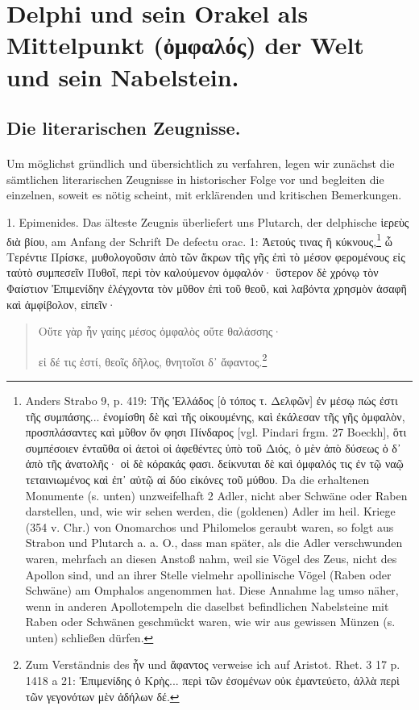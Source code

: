 \documentclass[a4paper, 11pt, oneside]{article}
\begin{document}
\section{Delphi und sein Orakel als Mittelpunkt (ὀμφαλός) der Welt und sein Nabelstein.}
\subsection{Die literarischen Zeugnisse.}
\paragraph{}
Um möglichst gründlich und übersichtlich zu verfahren, legen wir zunächst die sämtlichen literarischen Zeugnisse in historischer Folge vor und begleiten die einzelnen, soweit es nötig scheint, mit erklärenden und kritischen Bemerkungen.

1. Epimenides. Das älteste Zeugnis überliefert uns Plutarch, der delphische ἱερεὺς διὰ βίου, am Anfang der Schrift De defectu orac. 1: Ἀετούς τινας ἢ κύκνους,\footnote{Anders Strabo 9, p. 419: Τῆς Ἑλλάδος [ὁ τόπος τ. Δελφῶν] ἐν μέσῳ πώς ἐστι τῆς συμπάσης... ἐνομίσθη δὲ καὶ τῆς οἰκουμένης, καὶ ἐκάλεσαν τῆς γῆς ὀμφαλὸν, προσπλάσαντες καὶ μῦθον ὅν φησι Πίνδαρος [vgl. Pindari frgm. 27 Boeckh], ὅτι συμπέσοιεν ἐνταῦθα οἱ ἀετοὶ οἱ ἀφεθέντες ὑπὸ τοῦ Διός, ὁ μὲν ἀπὸ δύσεως ὁ δ᾽ ἀπὸ τῆς ἀνατολῆς· οἱ δὲ κόρακάς φασι. δείκνυται δὲ καὶ ὀμφαλός τις ἐν τῷ ναῷ τεταινιωμένος καὶ ἐπ᾽ αὐτῷ αἱ δύο εἰκόνες τοῦ μύθου. Da die erhaltenen Monumente (s. unten) unzweifelhaft 2 Adler, nicht aber Schwäne oder Raben darstellen, und, wie wir sehen werden, die (goldenen) Adler im heil. Kriege (354 v. Chr.) von Onomarchos und Philomelos geraubt waren, so folgt aus Strabon und Plutarch a. a. O., dass man später, als die Adler verschwunden waren, mehrfach an diesen Anstoß nahm, weil sie Vögel des Zeus, nicht des Apollon sind, und an ihrer Stelle vielmehr apollinische Vögel (Raben oder Schwäne) am Omphalos angenommen hat. Diese Annahme lag umso näher, wenn in anderen Apollotempeln die daselbst befindlichen Nabelsteine mit Raben oder Schwänen geschmückt waren, wie wir aus gewissen Münzen (s. unten) schließen dürfen.} ὦ Τερέντιε Πρίσκε, μυθολογοῦσιν ἀπὸ τῶν ἄκρων τῆς γῆς ἐπὶ τὸ μέσον φερομένους εἰς ταὐτὸ συμπεσεῖν Πυθοῖ, περὶ τὸν καλούμενον ὀμφαλόν· ὕστερον δὲ χρόνῳ τὸν Φαίστιον Ἐπιμενίδην ἐλέγχοντα τὸν μῦθον ἐπὶ τοῦ θεοῦ, καὶ λαβόντα χρησμὸν ἀσαφῆ καὶ ἀμφίβολον, εἰπεῖν·
\begin{quotation}
Οὔτε γὰρ ἦν γαίης μέσος ὀμφαλὸς οὔτε θαλάσσης·

εἰ δέ τις ἐστί, θεοῖς δῆλος, θνητοῖσι δ᾽ ἄφαντος.\footnote{Zum Verständnis des ἦν und ἄφαντος verweise ich auf Aristot. Rhet. 3 17 p. 1418 a 21: Ἐπιμενίδης ὁ Κρὴς... περὶ τῶν ἐσομένων οὐκ ἐμαντεύετο, ἀλλὰ περὶ τῶν γεγονότων μὲν ἀδήλων δέ.}
\end{quotation}
\end{document}
